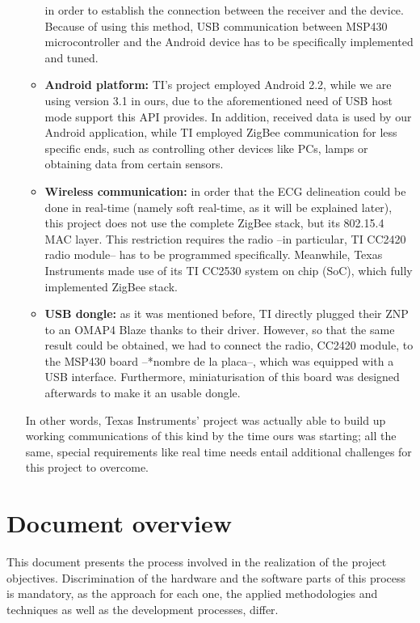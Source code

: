 \begin{itemize}
\begin{itemize}
						in order to establish the connection between the receiver and the device. Because of
						using this method, USB communication between MSP430 microcontroller and the Android
						device has to be specifically implemented and tuned.
					\item \textbf{Android platform:} TI's project employed Android 2.2, while we are using
						version	3.1 in ours, due to the aforementioned need of USB host mode support this API
						provides. In addition, received data is used by our Android application, while TI
						employed ZigBee communication for less specific ends, such as controlling other devices
						like PCs, lamps or obtaining data from certain sensors.
					\item \textbf{Wireless communication:} in order that the ECG delineation could be done in
						real-time (namely soft real-time, as it will be explained later), this project does not
						use the complete ZigBee stack, but its 802.15.4 MAC layer. This restriction requires the
						radio --in particular, TI CC2420 radio module-- has to be programmed specifically.
						Meanwhile, Texas Instruments made use of its TI CC2530 system on chip (SoC), which fully 
						implemented ZigBee stack.
					\item \textbf{USB dongle:} as it was mentioned before, TI directly plugged their ZNP to an
						OMAP4 Blaze thanks to their driver. However, so that the same result could be obtained,
						we had to connect the radio, CC2420 module, to the MSP430 board --*nombre de la placa--,
						which was equipped with a USB interface. Furthermore, miniaturisation of this board was
						designed afterwards to make it an usable dongle.
				\end{itemize}
				In other words, Texas Instruments' project was actually able to build up working communications
				of this kind by the time ours was starting; all the same, special requirements like real time
				needs entail additional challenges for this project to overcome.
		\end{itemize}
	
	\section{Document overview}
	\label{sec:prj-oview}
		This document presents the process involved in the realization of the project objectives. Discrimination of the hardware and the software parts of this process is mandatory, as the approach for each one, the applied methodologies and techniques as well as the development processes, differ.\\

